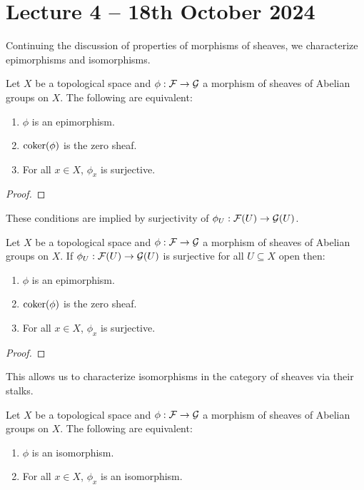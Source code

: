 \section{Lecture 4 -- 18th October 2024}\label{sec: lecture 4}
Continuing the discussion of properties of morphisms of sheaves, we characterize epimorphisms and isomorphisms. 
\begin{proposition}\label{prop: equivalent conditions on epimorphisms}
    Let $X$ be a topological space and $\phi:\mathcal{F}\to\mathcal{G}$ a morphism of sheaves of Abelian groups on $X$. The following are equivalent:
    \begin{enumerate}[label=(\alph*)]
        \item $\phi$ is an epimorphism. 
        \item $\mathrm{coker}(\phi)$ is the zero sheaf. 
        \item For all $x\in X$, $\phi_{x}$ is surjective. 
    \end{enumerate}
\end{proposition}
\begin{proof}
\end{proof}
These conditions are implied by surjectivity of $\phi_{U}:\mathcal{F}(U)\to\mathcal{G}(U)$. 
\begin{proposition}\label{prop: surjective implies epimorphisms}
    Let $X$ be a topological space and $\phi:\mathcal{F}\to\mathcal{G}$ a morphism of sheaves of Abelian groups on $X$. If $\phi_{U}:\mathcal{F}(U)\to\mathcal{G}(U)$ is surjective for all $U\subseteq X$ open then:
    \begin{enumerate}[label=(\roman*)]
        \item $\phi$ is an epimorphism. 
        \item $\mathrm{coker}(\phi)$ is the zero sheaf. 
        \item For all $x\in X$, $\phi_{x}$ is surjective. 
    \end{enumerate}
\end{proposition}
\begin{proof}
\end{proof}
This allows us to characterize isomorphisms in the category of sheaves via their stalks. 
\begin{corollary}\label{corr: isomorphism of sheaves}
    Let $X$ be a topological space and $\phi:\mathcal{F}\to\mathcal{G}$ a morphism of sheaves of Abelian groups on $X$. The following are equivalent:
    \begin{enumerate}[label=(\alph*)]
        \item $\phi$ is an isomorphism. 
        \item For all $x\in X$, $\phi_{x}$ is an isomorphism. 
    \end{enumerate}
\end{corollary}
